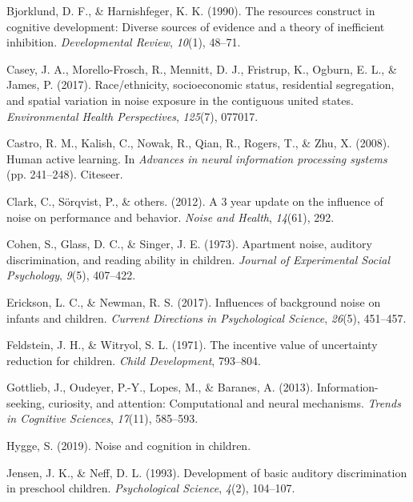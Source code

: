 \documentclass[10pt, letterpaper]{article}
\newenvironment{CSLReferences}%
  {}%
  {\par}
\begin{document}
\noindent

\hypertarget{refs}{}
\begin{CSLReferences}{1}{0}
\leavevmode\hypertarget{ref-bjorklund1990}{}%
Bjorklund, D. F., \& Harnishfeger, K. K. (1990). The resources construct
in cognitive development: Diverse sources of evidence and a theory of
inefficient inhibition. \emph{Developmental Review}, \emph{10}(1),
48--71.

\leavevmode\hypertarget{ref-casey2017}{}%
Casey, J. A., Morello-Frosch, R., Mennitt, D. J., Fristrup, K., Ogburn,
E. L., \& James, P. (2017). Race/ethnicity, socioeconomic status,
residential segregation, and spatial variation in noise exposure in the
contiguous united states. \emph{Environmental Health Perspectives},
\emph{125}(7), 077017.

\leavevmode\hypertarget{ref-castro2008}{}%
Castro, R. M., Kalish, C., Nowak, R., Qian, R., Rogers, T., \& Zhu, X.
(2008). Human active learning. In \emph{Advances in neural information
processing systems} (pp. 241--248). Citeseer.

\leavevmode\hypertarget{ref-clark20123}{}%
Clark, C., Sörqvist, P., \& others. (2012). A 3 year update on the
influence of noise on performance and behavior. \emph{Noise and Health},
\emph{14}(61), 292.

\leavevmode\hypertarget{ref-cohen1973}{}%
Cohen, S., Glass, D. C., \& Singer, J. E. (1973). Apartment noise,
auditory discrimination, and reading ability in children. \emph{Journal
of Experimental Social Psychology}, \emph{9}(5), 407--422.

\leavevmode\hypertarget{ref-erickson2017}{}%
Erickson, L. C., \& Newman, R. S. (2017). Influences of background noise
on infants and children. \emph{Current Directions in Psychological
Science}, \emph{26}(5), 451--457.

\leavevmode\hypertarget{ref-feldstein1971}{}%
Feldstein, J. H., \& Witryol, S. L. (1971). The incentive value of
uncertainty reduction for children. \emph{Child Development}, 793--804.

\leavevmode\hypertarget{ref-gottlieb2013}{}%
Gottlieb, J., Oudeyer, P.-Y., Lopes, M., \& Baranes, A. (2013).
Information-seeking, curiosity, and attention: Computational and neural
mechanisms. \emph{Trends in Cognitive Sciences}, \emph{17}(11),
585--593.

\leavevmode\hypertarget{ref-hygge2019}{}%
Hygge, S. (2019). Noise and cognition in children.

\leavevmode\hypertarget{ref-jensen1993}{}%
Jensen, J. K., \& Neff, D. L. (1993). Development of basic auditory
discrimination in preschool children. \emph{Psychological Science},
\emph{4}(2), 104--107.


\end{CSLReferences}
\end{document}
